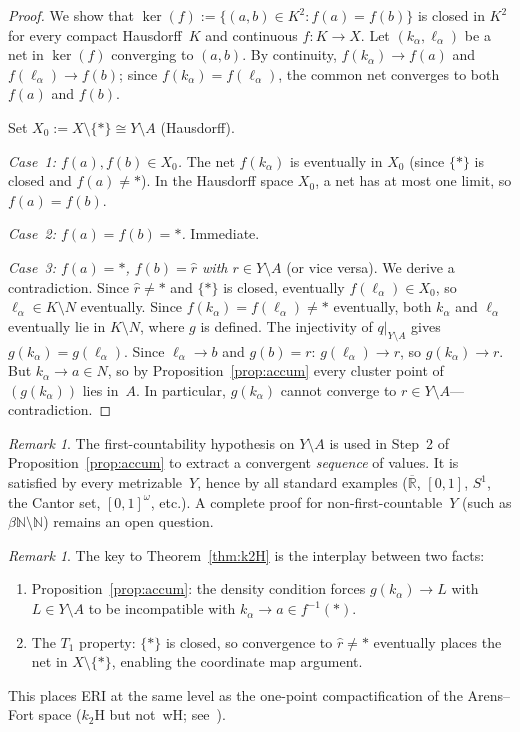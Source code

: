 \documentclass[11pt]{article}
\theoremstyle{definition}
\theoremstyle{remark}
\newtheorem{remark}[theorem]{Remark}
\begin{document}
\begin{proof}
We show that $\ker(f) := \{(a,b) \in K^2 : f(a) = f(b)\}$ is closed
in $K^2$ for every compact Hausdorff~$K$ and continuous
$f\colon K \to X$.
Let $(k_\alpha, \ell_\alpha)$ be a net in $\ker(f)$ converging to $(a,b)$.
By continuity, $f(k_\alpha) \to f(a)$ and $f(\ell_\alpha) \to f(b)$;
since $f(k_\alpha) = f(\ell_\alpha)$, the common net converges to both
$f(a)$ and $f(b)$.

Set $X_0 := X \setminus \{\ast\} \cong Y \setminus A$ (Hausdorff).

\emph{Case~1: $f(a), f(b) \in X_0$.}
The net $f(k_\alpha)$ is eventually in $X_0$ (since $\{\ast\}$ is closed
and $f(a) \neq \ast$). In the Hausdorff space $X_0$, a net has at most
one limit, so $f(a) = f(b)$.

\emph{Case~2: $f(a) = f(b) = \ast$.} Immediate.

\emph{Case~3: $f(a) = \ast$, $f(b) = \hat{r}$ with
$r \in Y \setminus A$} (or vice versa).
We derive a contradiction.
Since $\hat{r} \neq \ast$ and $\{\ast\}$ is closed, eventually
$f(\ell_\alpha) \in X_0$, so $\ell_\alpha \in K \setminus N$ eventually.
Since $f(k_\alpha) = f(\ell_\alpha) \neq \ast$ eventually,
both $k_\alpha$ and $\ell_\alpha$ eventually lie in $K \setminus N$,
where $g$ is defined.
The injectivity of $q|_{Y \setminus A}$ gives
$g(k_\alpha) = g(\ell_\alpha)$.
Since $\ell_\alpha \to b$ and $g(b) = r$: $g(\ell_\alpha) \to r$, so
$g(k_\alpha) \to r$.
But $k_\alpha \to a \in N$, so by Proposition~\ref{prop:accum} every
cluster point of $(g(k_\alpha))$ lies in~$A$. In particular,
$g(k_\alpha)$ cannot converge to $r \in Y \setminus A$---contradiction.
\end{proof}

\begin{remark}\label{rem:k2Hgeneral}
The first-countability hypothesis on $Y \setminus A$ is used in Step~2
of Proposition~\ref{prop:accum} to extract a convergent \emph{sequence}
of values. It is satisfied by every metrizable~$Y$, hence by all
standard examples ($\overline{\mathbb{R}}$, $[0,1]$, $S^1$, the Cantor
set, $[0,1]^\omega$, etc.).
A complete proof for non-first-countable~$Y$ (such as
$\beta\mathbb{N} \setminus \mathbb{N}$) remains an open question.
\end{remark}

\begin{remark}\label{rmk:k2H-method}
The key to Theorem~\ref{thm:k2H} is the interplay between two facts:
\begin{enumerate}[nosep]
\item Proposition~\ref{prop:accum}: the density condition forces
  $g(k_\alpha) \to L$ with $L \in Y \setminus A$ to be
  incompatible with $k_\alpha \to a \in f^{-1}(\ast)$.
\item The $T_1$ property: $\{\ast\}$ is closed, so convergence to
  $\hat{r} \neq \ast$ eventually places the net in $X \setminus
  \{\ast\}$, enabling the coordinate map argument.
\end{enumerate}
This places ERI at the same level as the one-point
compactification of the Arens--Fort space ($k_2$H but not~wH;
see~\cite{bib:clontz}).
\end{remark}
\end{document}
